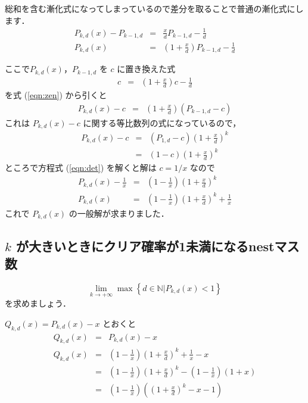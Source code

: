 \documentclass[a4j, 12pt]{jsarticle}
\newcommand{\nat}{\mathbb{N}}
\renewcommand{\P}{P_{k,d}(x)}
\newcommand{\Q}{Q_{k,d}(x)}
\begin{document}
総和を含む漸化式になってしまっているので差分を取ることで普通の漸化式にします．
\begin{eqnarray}
  \P-P_{k-1,d}&=&\frac{x}{d}P_{k-1,d}-\frac{1}{d}\\
  \P&=&\left(1+\frac{x}{d}\right)P_{k-1,d}-\frac{1}{d}\label{eqn:zen}
\end{eqnarray}

ここで$\P$，$P_{k-1,d}$ を $c$ に置き換えた式
\begin{eqnarray}
  c&=&\left(1+\frac{x}{d}\right)c-\frac{1}{d}\label{eqn:det}
\end{eqnarray}
を式 (\ref{eqn:zen}) から引くと
\begin{eqnarray}
  \P-c&=&\left(1+\frac{x}{d}\right)\left(P_{k-1,d}-c\right)
\end{eqnarray}
これは $\P-c$ に関する等比数列の式になっているので，
\begin{eqnarray}
  \P-c&=&\left(P_{1,d}-c\right)\left(1+\frac{x}{d}\right)^k\\
           &=&\left(1      -c\right)\left(1+\frac{x}{d}\right)^k
\end{eqnarray}
ところで方程式 (\ref{eqn:det}) を解くと解は $c=1/x$ なので
\begin{eqnarray}
  \P-\frac{1}{x}&=&\left(1-\frac{1}{x}\right)\left(1+\frac{x}{d}\right)^k\\
  \P            &=&\left(1-\frac{1}{x}\right)\left(1+\frac{x}{d}\right)^k+\frac{1}{x} \label{eqn:gen}
\end{eqnarray}
これで $\P$ の一般解\cite{rpakr}が求まりました．

\subsection{$k$ が大きいときにクリア確率が1未満になるnestマス数}
\begin{equation}
  \lim_{k \rightarrow +\infty}\max\left\{d \in \nat|\P<1\right\} \label{eqn:ans}
\end{equation}
を求めましょう．

$\Q = \P-x$ とおくと
\begin{eqnarray}
  \Q&=&\P - x\\
  \Q&=&\left(1-\frac{1}{x}\right) \left(1+\frac{x}{d}\right)^k + \frac{1}{x} - x\\
    &=&\left(1-\frac{1}{x}\right) \left(1+\frac{x}{d}\right)^k - \left(1-\frac{1}{x}\right)(1+x)\\
    &=&\left(1-\frac{1}{x}\right) \left(\left(1+\frac{x}{d}\right)^k -x-1\right)
\end{eqnarray}
\end{document}
